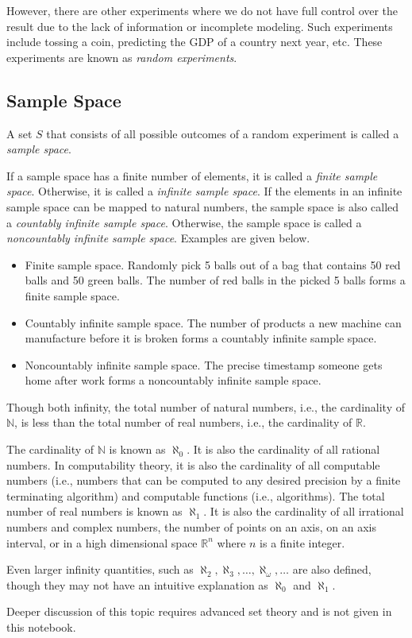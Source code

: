 However, there are other experiments where we do not have full control over the result due to the lack of information or incomplete modeling. Such experiments include tossing a coin, predicting the GDP of a country next year, etc. These experiments are known as \textit{random experiments}.

\subsection{Sample Space}

A set $S$ that consists of all possible outcomes of a random experiment is called a \textit{sample space}. 

If a sample space has a finite number of elements, it is called a \textit{finite sample space}. Otherwise, it is called a \textit{infinite sample space}. If the elements in an infinite sample space can be mapped to natural numbers, the sample space is also called a \textit{countably infinite sample space}. Otherwise, the sample space is called a \textit{noncountably infinite sample space}. Examples are given below.
\begin{itemize}
	\item Finite sample space. Randomly pick 5 balls out of a bag that contains 50 red balls and 50 green balls. The number of red balls in the picked 5 balls forms a finite sample space.
	\item Countably infinite sample space. The number of products a new machine can manufacture before it is broken forms a countably infinite sample space.
	\item Noncountably infinite sample space. The precise timestamp someone gets home after work forms a noncountably infinite sample space. 
\end{itemize}

\begin{shortbox}
Though both infinity, the total number of natural numbers, i.e., the cardinality of $\mathbb{N}$, is less than the total number of real numbers, i.e., the cardinality of $\mathbb{R}$.

The cardinality of $\mathbb{N}$ is known as $\aleph_0$. It is also the cardinality of all rational numbers. In computability theory, it is also the cardinality of all computable numbers (i.e., numbers that can be computed to any desired precision by a finite terminating algorithm) and computable functions (i.e., algorithms). The total number of real numbers is known as $\aleph_1$. It is also the cardinality of all irrational numbers and complex numbers, the number of points on an axis, on an axis interval, or in a high dimensional space $\mathbb{R}^n$ where $n$ is a finite integer. 

Even larger infinity quantities, such as $\aleph_2, \aleph_3, \ldots, \aleph_\omega, \ldots$ are also defined, though they may not have an intuitive explanation as $\aleph_0$ and $\aleph_1$.

Deeper discussion of this topic requires advanced set theory and is not given in this notebook.
\end{shortbox}

